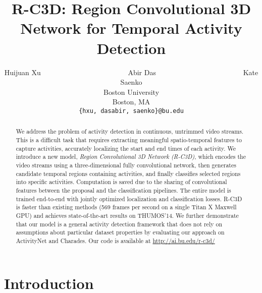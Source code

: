 \documentclass[10pt,twocolumn,letterpaper]{article}
\newcommand{\modelname}[0]{R-C3D }
\begin{document}
\title{R-C3D: Region Convolutional 3D Network for Temporal Activity Detection}





\author{Huijuan Xu~~~~~~~~~~~~~~~~~~~~~~~~
Abir Das~~~~~~~~~~~~~~~~~~~~~~~~
Kate Saenko\\
Boston University\\
Boston, MA\\
{\tt\small \{hxu, dasabir, saenko\}@bu.edu}
}

\maketitle



\begin{abstract} 
We address the problem of activity detection in continuous, untrimmed video streams.
This is a difficult task that requires extracting meaningful spatio-temporal features to capture activities, accurately localizing the start and end times of each activity.
We introduce a new model, \textit{Region Convolutional 3D Network (R-C3D)}, which encodes the video streams using a three-dimensional fully convolutional network, then generates candidate temporal regions containing activities, and finally classifies selected regions into specific activities.
Computation is saved due to the sharing of convolutional features between the proposal and the classification pipelines.
The entire model is trained end-to-end with jointly optimized localization and classification losses.
\modelname is faster than existing methods (569 frames per second on a single Titan X Maxwell GPU) and achieves state-of-the-art results on THUMOS'14.
We further demonstrate that our model is a general activity detection framework that does not rely on assumptions about particular dataset properties by evaluating our approach on ActivityNet and Charades.
Our code is available at \url{http://ai.bu.edu/r-c3d/}

\end{abstract}  \vspace{-0.2in}
\section{Introduction}
\end{document}
